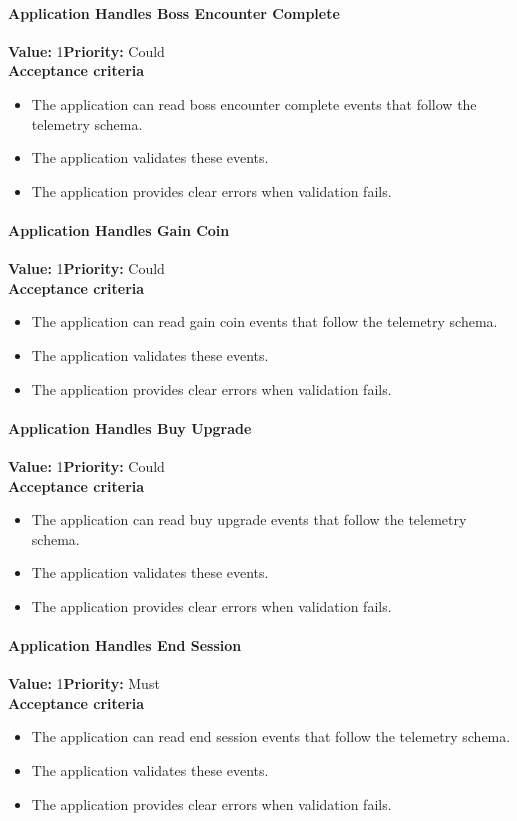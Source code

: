 \paragraph{Application Handles Boss Encounter Complete}
\textbf{Value:} 1\quad \textbf{Priority:} Could\\
\textbf{Acceptance criteria}
\begin{itemize}
  \item The application can read boss encounter complete events that follow the telemetry schema.
  \item The application validates these events.
  \item The application provides clear errors when validation fails.
\end{itemize}

\paragraph{Application Handles Gain Coin}
\textbf{Value:} 1\quad \textbf{Priority:} Could\\
\textbf{Acceptance criteria}
\begin{itemize}
  \item The application can read gain coin events that follow the telemetry schema.
  \item The application validates these events.
  \item The application provides clear errors when validation fails.
\end{itemize}

\paragraph{Application Handles Buy Upgrade}
\textbf{Value:} 1\quad \textbf{Priority:} Could\\
\textbf{Acceptance criteria}
\begin{itemize}
  \item The application can read buy upgrade events that follow the telemetry schema.
  \item The application validates these events.
  \item The application provides clear errors when validation fails.
\end{itemize}

\paragraph{Application Handles End Session}
\textbf{Value:} 1\quad \textbf{Priority:} Must\\
\textbf{Acceptance criteria}
\begin{itemize}
  \item The application can read end session events that follow the telemetry schema.
  \item The application validates these events.
  \item The application provides clear errors when validation fails.
\end{itemize}

